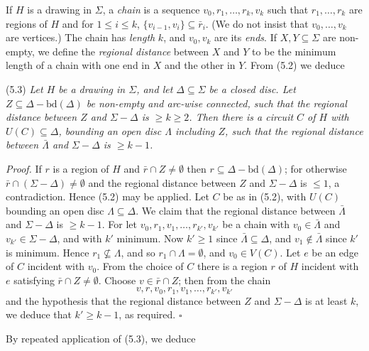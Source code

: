 If $H$ is a drawing in $\Sigma$, a \textit{chain} is a sequence $v_0, r_1, \dots, r_k, v_k$ such that $r_1, \dots, r_k$ are regions of $H$ and for $1 \le i \le k$, $\{v_{i-1}, v_i\} \subseteq \bar{r}_i$. (We do not insist that $v_0, \dots, v_k$ are vertices.) The chain has \textit{length} $k$, and $v_0, v_k$ are its \textit{ends}. If $X, Y \subseteq \Sigma$ are non-empty, we define the \textit{regional distance} between $X$ and $Y$ to be the minimum length of a chain with one end in $X$ and the other in $Y$. From (5.2) we deduce

\stmt
(5.3) \textit{Let $H$ be a drawing in $\Sigma$, and let $\Delta \subseteq \Sigma$ be a closed disc. Let $Z \subseteq \Delta - \text{bd}(\Delta)$ be non-empty and arc-wise connected, such that the regional distance between $Z$ and $\Sigma - \Delta$ is $\ge k \ge 2$. Then there is a circuit $C$ of $H$ with $U(C) \subseteq \Delta$, bounding an open disc $\Lambda$ including $Z$, such that the regional distance between $\bar{\Lambda}$ and $\Sigma - \Delta$ is $\ge k - 1$.}

\textit{Proof.} If $r$ is a region of $H$ and $\bar{r} \cap Z \ne \emptyset$ then $r \subseteq \Delta - \text{bd}(\Delta)$; for otherwise $\bar{r} \cap (\Sigma - \Delta) \ne \emptyset$ and the regional distance between $Z$ and $\Sigma - \Delta$ is $\le 1$, a contradiction. Hence (5.2) may be applied. Let $C$ be as in (5.2), with $U(C)$ bounding an open disc $\Lambda \subseteq \Delta$. We claim that the regional distance between $\bar{\Lambda}$ and $\Sigma - \Delta$ is $\ge k - 1$. For let $v_0, r_1, v_1, \dots, r_{k'}, v_{k'}$ be a chain with $v_0 \in \bar{\Lambda}$ and $v_{k'} \in \Sigma - \Delta$, and with $k'$ minimum. Now $k' \ge 1$ since $\bar{\Lambda} \subseteq \Delta$, and $v_1 \notin \bar{\Lambda}$ since $k'$ is minimum. Hence $r_1 \not\subseteq \Lambda$, and so $r_1 \cap \Lambda = \emptyset$, and $v_0 \in V(C)$. Let $e$ be an edge of $C$ incident with $v_0$. From the choice of $C$ there is a region $r$ of $H$ incident with $e$ satisfying $\bar{r} \cap Z \ne \emptyset$. Choose $v \in \bar{r} \cap Z$; then from the chain
\begin{equation*}
v, r, v_0, r_1, v_1, \dots, r_{k'}, v_{k'}
\end{equation*}
and the hypothesis that the regional distance between $Z$ and $\Sigma - \Delta$ is at least $k$, we deduce that $k' \ge k - 1$, as required. $\square$

By repeated application of (5.3), we deduce

